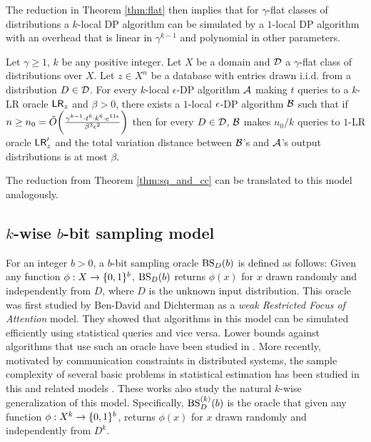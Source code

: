 The reduction in Theorem \ref{thm:flat} then implies that for $\gamma$-flat classes of distributions a $k$-local DP algorithm can be simulated by a $1$-local DP algorithm with an overhead that is linear in $\gamma^{k-1}$ and polynomial in other parameters.
\begin{theorem}\label{thm:flat-dp}
Let $\gamma \geq 1$,  $k$ be any positive integer. Let $X$ be a domain and $\mathcal{D}$ a $\gamma$-flat class of distributions over $X$. Let $z \in X^n$ be a database with entries drawn i.i.d. from a distribution $D \in \mathcal{D}$.  For every $k$-local $\epsilon$-DP algorithm $\mathcal{A}$ making $t$ queries to a $k$-LR oracle $\mathsf{LR}_z$ and $\beta>0$, there exists a $1$-local $\epsilon$-DP algorithm $\mathcal{B}$ such that if $n \geq n_0=
\tilde{O}\bigg(\frac{\gamma^{k-1}\cdot t^6 \cdot k^6\cdot e^{11\epsilon} }{\beta^3\epsilon^2} \bigg)$
then  for every $D\in \mathcal{D}$, $\mathcal{B}$ makes $n_0/k$ queries to $1$-LR oracle $\mathsf{LR}'_z$ and the total variation distance between $\mathcal{B}$'s and $\mathcal{A}$'s output distributions is at most $\beta$.
\end{theorem}
The reduction from Theorem \ref{thm:sq_and_cc} can be translated to this model analogously.

\subsection{$k$-wise $b$-bit sampling model}\label{subsec:RFA}
For an integer $b>0$, a $b$-bit sampling oracle $\mbox{BS}_D(b)$ is defined as follows: Given any function $\phi: X \to \{0, 1\}^b$, $\mbox{BS}_D(b)$  returns $\phi(x)$ for $x$ drawn randomly and independently from $D$, where $D$ is the unknown input distribution. This oracle was first studied by Ben-David and Dichterman \cite{Ben-DavidD98} as a {\em weak Restricted Focus of Attention} model. They showed that algorithms in this model can be simulated efficiently using statistical queries and vice versa. Lower bounds against algorithms that use such an oracle have been studied in \cite{FeldmanGRVX:12,FeldmanPV:13}. More recently, motivated by communication constraints in distributed systems, the sample complexity of several basic problems in statistical estimation has been studied in this and related models \cite{ZhangDJW13,SteinhardtD15,SteinhardtVW16}. These works also study the natural $k$-wise generalization of this model. Specifically, $\mbox{BS}^{(k)}_D(b)$ is the oracle that given any function $\phi: X^k \to \{0, 1\}^b$, returns $\phi(x)$ for $x$ drawn randomly and independently from $D^k$.

